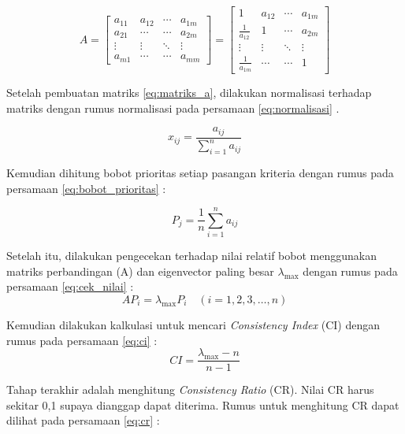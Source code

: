 \documentclass[journal,article,submit,pdftex,moreauthors]{Definitions/mdpi}
\begin{document}
\begin{equation}
A = \begin{bmatrix}
a_{11} & a_{12} & \cdots & a_{1m} \\
a_{21} & \cdots & \cdots & a_{2m} \\
\vdots & \vdots & \ddots & \vdots \\
a_{m1} & \cdots & \cdots & a_{mm}
\end{bmatrix} = 
\begin{bmatrix}
1 & a_{12} & \cdots & a_{1m} \\
\frac{1}{a_{12}} & 1 & \cdots & a_{2m} \\
\vdots & \vdots & \ddots & \vdots \\
\frac{1}{a_{1m}} & \cdots & \cdots & 1
\end{bmatrix}
\label{eq:matriks_a}
\end{equation}

Setelah pembuatan matriks \ref{eq:matriks_a}, dilakukan normalisasi terhadap matriks dengan rumus normalisasi pada persamaan \ref{eq:normalisasi} \cite{Singh2019}.

\begin{equation}
x_{ij} = \frac{a_{ij}}{\sum_{i=1}^{n} a_{ij}}
\label{eq:normalisasi}
\end{equation}

Kemudian dihitung bobot prioritas setiap pasangan kriteria dengan rumus pada persamaan \ref{eq:bobot_prioritas} \cite{Singh2019}:

\begin{equation}
P_j = \frac{1}{n} \sum_{i=1}^{n} a_{ij}
\label{eq:bobot_prioritas}
\end{equation}

Setelah itu, dilakukan pengecekan terhadap nilai relatif bobot menggunakan matriks perbandingan (A) dan eigenvector paling besar $\lambda_{\text{max}}$ dengan rumus pada persamaan \ref{eq:cek_nilai} \cite{Singh2019}:
\begin{equation}
AP_i = \lambda_{\text{max}} P_i \quad (i = 1, 2, 3, \ldots, n)
\label{eq:cek_nilai}
\end{equation}

Kemudian dilakukan kalkulasi untuk mencari \textit{Consistency Index} (CI) dengan rumus pada persamaan \ref{eq:ci} \cite{Singh2019}:
\begin{equation}
CI = \frac{\lambda_{\text{max}} - n}{n - 1}
\label{eq:ci}
\end{equation}

Tahap terakhir adalah menghitung \textit{Consistency Ratio} (CR). Nilai CR harus sekitar 0,1 supaya dianggap dapat diterima. Rumus untuk menghitung CR dapat dilihat pada persamaan \ref{eq:cr} \cite{Singh2019}:
\end{document}
